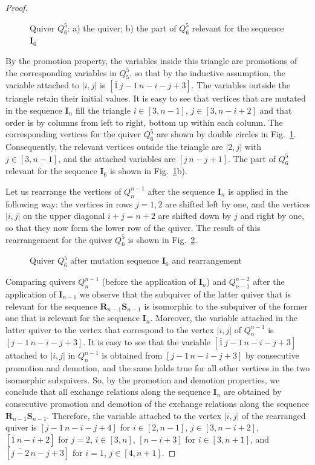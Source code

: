 \documentclass[10pt,a4paper]{amsart}
\def\Is{\mathbf I}
\def\Rs{\mathbf R}
\def\S{{\mathbf S}}
\begin{document}
\begin{proof}
\begin{figure}[ht]
\begin{center}
\caption{Quiver $Q_6^5$: a) the quiver; b) the part of $Q_6^5$ relevant for the sequence $\Is_6$}
\label{Q65}
\end{center}
\end{figure}

By the promotion property, the variables inside this triangle are promotions of the 
corresponding variables in $Q_5^5$, so that by the inductive assumption, the variable attached to $|i,j|$ is
$[\bar1\, j-1\,n-i-j+3]$. The variables outside the triangle retain their initial values. It is easy to see 
that vertices that are mutated in the sequence $\Is_n$ fill the triangle $i\in[3,n-1]$, $j\in[3,n-i+2]$ and that order is by columns from left to right, bottom up within each column. The corresponding vertices for the quiver $Q_6^5$ are shown by double circles in Fig.~\ref{Q65}.  Consequently, the relevant vertices outside the triangle 
are $|2,j|$ with $j\in[3,n-1]$, and the attached variables are $[j\,n-j+1]$. The part of $Q_6^5$ relevant for the sequence $\Is_6$ is shown in Fig.~\ref{Q65}b).

Let us rearrange the vertices of $Q_n^{n-1}$ 
after the sequence $\Is_n$ is applied in the following way: the vertices in rows $j=1,2$ are shifted left by one, and the vertices $|i,j|$ on the upper diagonal $i+j=n+2$ are shifted down by $j$ and right by one, so that they now form the lower row of the quiver. The result of this rearrangement for the quiver $Q_6^5$ is shown in Fig.~\ref{Q65I}.

\begin{figure}[ht]
\begin{center}

\caption{Quiver $Q_6^5$ after mutation sequence $\Is_6$ and rearrangement}
\label{Q65I}
\end{center}
\end{figure}
 
Comparing quivers $Q_n^{n-1}$ (before the application of $\Is_n$) and $Q_{n-1}^{n-2}$ after the application of $\Is_{n-1}$ we observe that the subquiver of the latter quiver that is relevant for the sequence $\Rs_{n-1}\S_{n-1}$ is isomorphic to 
the subquiver of the former one that is relevant for the sequence  $\Is_n$. Moreover, the variable attached in the latter 
quiver to the vertex that correspond to the vertex $|i,j|$ of $Q_n^{n-1}$ is $[j-1\, n-i-j+3]$. It is easy to see that
the variable $[\bar1\, j-1\,n-i-j+3]$ attached to $|i,j|$ in $Q_n^{n-1}$ is obtained from $[j-1\, n-i-j+3]$ by consecutive promotion and demotion, and the same holds true for all other vertices in the two isomorphic subquivers. 
So, by the promotion and demotion properties, we conclude that all exchange relations along the sequence $\Is_n$ are
obtained by consecutive promotion and demotion of the exchange relations along the sequence $\Rs_{n-1}\S_{n-1}$. Therefore, the variable attached to the vertex $|i,j|$ of the rearranged quiver is $[j-1\,n-i-j+4]$ for $i\in[2,n-1]$, 
$j\in [3,n-i+2]$, $[\bar1\, n-i+2]$ for $j=2$, $i\in[3,n]$,  $[n-i+3]$ for $i\in[3,n+1]$, and 
$[\overline{j-2}\, n-j+3]$ for $i=1$, $j\in[4,n+1]$.


\end{proof}
\end{document}
